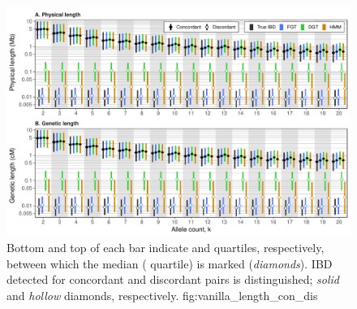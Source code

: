 

\begin{figure}[!htb]
\includegraphics[width=\textwidth]{./img/ch5/vanilla_length_con_dis}
{Bottom and top of each bar indicate  and  quartiles, respectively, between which the median ( quartile) is marked (\emph{diamonds}).
IBD detected for concordant and discordant pairs is distinguished; \emph{solid} and \emph{hollow} diamonds, respectively.}
{fig:vanilla_length_con_dis}
\end{figure}
